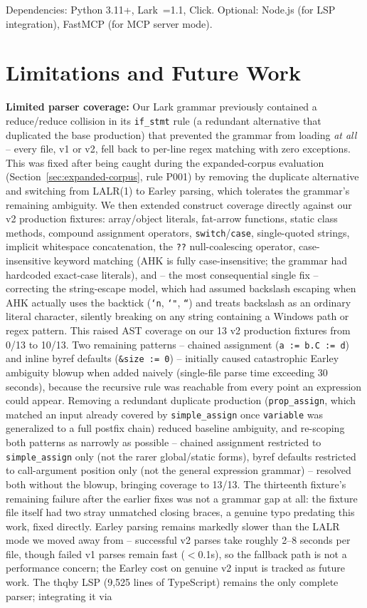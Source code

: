 \documentclass[11pt,a4paper]{article}
\begin{document}
Dependencies: Python 3.11+, Lark~=1.1, Click. Optional: Node.js (for LSP integration), FastMCP (for MCP server mode).

\section{Limitations and Future Work}
\label{sec:limitations}

\textbf{Limited parser coverage:} Our Lark grammar previously contained a reduce/reduce collision in its \texttt{if\_stmt} rule (a redundant alternative that duplicated the base production) that prevented the grammar from loading \emph{at all} -- every file, v1 or v2, fell back to per-line regex matching with zero exceptions. This was fixed after being caught during the expanded-corpus evaluation (Section~\ref{sec:expanded-corpus}, rule P001) by removing the duplicate alternative and switching from LALR(1) to Earley parsing, which tolerates the grammar's remaining ambiguity. We then extended construct coverage directly against our v2 production fixtures: array/object literals, fat-arrow functions, static class methods, compound assignment operators, \texttt{switch}/\texttt{case}, single-quoted strings, implicit whitespace concatenation, the \texttt{??} null-coalescing operator, case-insensitive keyword matching (AHK is fully case-insensitive; the grammar had hardcoded exact-case literals), and -- the most consequential single fix -- correcting the string-escape model, which had assumed backslash escaping when AHK actually uses the backtick (\texttt{`n}, \texttt{`"}, \texttt{``}) and treats backslash as an ordinary literal character, silently breaking on any string containing a Windows path or regex pattern. This raised AST coverage on our 13 v2 production fixtures from 0/13 to 10/13. Two remaining patterns -- chained assignment (\texttt{a := b.C := d}) and inline byref defaults (\texttt{\&size := 0}) -- initially caused catastrophic Earley ambiguity blowup when added naively (single-file parse time exceeding 30 seconds), because the recursive rule was reachable from every point an expression could appear. Removing a redundant duplicate production (\texttt{prop\_assign}, which matched an input already covered by \texttt{simple\_assign} once \texttt{variable} was generalized to a full postfix chain) reduced baseline ambiguity, and re-scoping both patterns as narrowly as possible -- chained assignment restricted to \texttt{simple\_assign} only (not the rarer global/static forms), byref defaults restricted to call-argument position only (not the general expression grammar) -- resolved both without the blowup, bringing coverage to 13/13. The thirteenth fixture's remaining failure after the earlier fixes was not a grammar gap at all: the fixture file itself had two stray unmatched closing braces, a genuine typo predating this work, fixed directly. Earley parsing remains markedly slower than the LALR mode we moved away from -- successful v2 parses take roughly 2--8 seconds per file, though failed v1 parses remain fast ($<$0.1s), so the fallback path is not a performance concern; the Earley cost on genuine v2 input is tracked as future work. The thqby LSP (9,525 lines of TypeScript) remains the only complete parser; integrating it via 
\end{document}
